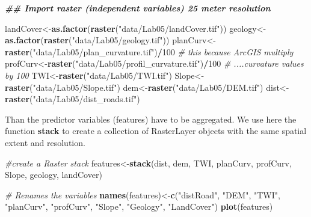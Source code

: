 \documentclass[
]{book}
\newenvironment{Shaded}{\begin{snugshade}}{\end{snugshade}}
\newcommand{\CommentTok}[1]{\textcolor[rgb]{0.56,0.35,0.01}{\textit{#1}}}
\newcommand{\DecValTok}[1]{\textcolor[rgb]{0.00,0.00,0.81}{#1}}
\newcommand{\DocumentationTok}[1]{\textcolor[rgb]{0.56,0.35,0.01}{\textbf{\textit{#1}}}}
\newcommand{\FunctionTok}[1]{\textcolor[rgb]{0.13,0.29,0.53}{\textbf{#1}}}
\newcommand{\NormalTok}[1]{#1}
\newcommand{\OtherTok}[1]{\textcolor[rgb]{0.56,0.35,0.01}{#1}}
\newcommand{\SpecialCharTok}[1]{\textcolor[rgb]{0.81,0.36,0.00}{\textbf{#1}}}
\newcommand{\StringTok}[1]{\textcolor[rgb]{0.31,0.60,0.02}{#1}}
\begin{document}
\begin{Shaded}
\begin{Highlighting}[]
\DocumentationTok{\#\# Import raster (independent variables) 25 meter resolution}

\NormalTok{landCover}\OtherTok{\textless{}{-}}\FunctionTok{as.factor}\NormalTok{(}\FunctionTok{raster}\NormalTok{(}\StringTok{"data/Lab05/landCover.tif"}\NormalTok{))}
\NormalTok{geology}\OtherTok{\textless{}{-}}\FunctionTok{as.factor}\NormalTok{(}\FunctionTok{raster}\NormalTok{(}\StringTok{"data/Lab05/geology.tif"}\NormalTok{))}
\NormalTok{planCurv}\OtherTok{\textless{}{-}}\FunctionTok{raster}\NormalTok{(}\StringTok{"data/Lab05/plan\_curvature.tif"}\NormalTok{)}\SpecialCharTok{/}\DecValTok{100} \CommentTok{\# this because ArcGIS multiply }
\NormalTok{profCurv}\OtherTok{\textless{}{-}}\FunctionTok{raster}\NormalTok{(}\StringTok{"data/Lab05/profil\_curvature.tif"}\NormalTok{)}\SpecialCharTok{/}\DecValTok{100} \CommentTok{\# ....curvature values by 100}
\NormalTok{TWI}\OtherTok{\textless{}{-}}\FunctionTok{raster}\NormalTok{(}\StringTok{"data/Lab05/TWI.tif"}\NormalTok{)}
\NormalTok{Slope}\OtherTok{\textless{}{-}}\FunctionTok{raster}\NormalTok{(}\StringTok{"data/Lab05/Slope.tif"}\NormalTok{)}
\NormalTok{dem}\OtherTok{\textless{}{-}}\FunctionTok{raster}\NormalTok{(}\StringTok{"data/Lab05/DEM.tif"}\NormalTok{)}
\NormalTok{dist}\OtherTok{\textless{}{-}}\FunctionTok{raster}\NormalTok{(}\StringTok{"data/Lab05/dist\_roads.tif"}\NormalTok{)}
\end{Highlighting}
\end{Shaded}

Than the predictor variables (features) have to be aggregated.
We use here the function \textbf{stack} to create a collection of RasterLayer objects with the same spatial extent and resolution.

\begin{Shaded}
\begin{Highlighting}[]
\CommentTok{\#create a Raster stack}
\NormalTok{features}\OtherTok{\textless{}{-}}\FunctionTok{stack}\NormalTok{(dist, dem, TWI, planCurv, profCurv, Slope, geology, landCover)}

\CommentTok{\# Renames the variables}
\FunctionTok{names}\NormalTok{(features)}\OtherTok{\textless{}{-}}\FunctionTok{c}\NormalTok{(}\StringTok{"distRoad"}\NormalTok{, }\StringTok{"DEM"}\NormalTok{, }\StringTok{"TWI"}\NormalTok{, }\StringTok{"planCurv"}\NormalTok{, }\StringTok{"profCurv"}\NormalTok{, }
                   \StringTok{"Slope"}\NormalTok{, }\StringTok{"Geology"}\NormalTok{, }\StringTok{"LandCover"}\NormalTok{)}
\FunctionTok{plot}\NormalTok{(features)}
\end{Highlighting}
\end{Shaded}
\end{document}
